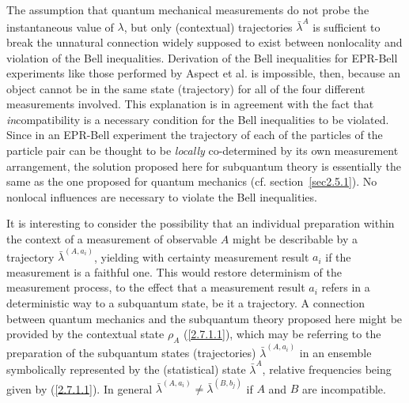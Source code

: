 \documentclass[12pt]{article}
\begin{document}
The assumption that quantum mechanical measurements do not probe
the instantaneous value of $\lambda$, but only (contextual)
trajectories $\bar{\lambda}^A$ is sufficient to break the
unnatural connection widely supposed to exist between nonlocality
and violation of the Bell inequalities. Derivation of the Bell
inequalities for EPR-Bell experiments like those performed by
Aspect et al. \cite{Asp81,Asp82} is impossible, then, because an
object cannot be in the same state (trajectory) for all of the
four different measurements involved. This explanation is in
agreement with the fact that {\em in}compatibility is a necessary
condition for the Bell inequalities to be violated. Since in an
EPR-Bell experiment the trajectory of each of the particles of the
particle pair can be thought to be {\em locally} co-determined by
its own measurement arrangement, the solution proposed here for
subquantum theory is essentially the same as the one proposed for
quantum mechanics (cf. section~\ref{sec2.5.1}). No nonlocal
influences are necessary to violate the Bell inequalities.

It is interesting to consider the possibility that an individual
preparation within the context of a measurement of observable $A$
might be describable by a trajectory $\bar{\lambda}^{(A,a_i)}$,
yielding with certainty measurement result $a_i$ if the
measurement is a faithful one. This would restore determinism of
the measurement process, to the effect that a measurement result
$a_i$ refers in a deterministic way to a subquantum state, be it a
trajectory. A connection between quantum mechanics and the
subquantum theory proposed here might be provided by the
contextual state $\rho_A$ (\ref{2.7.1.1}), which may be referring
to the preparation of the subquantum states (trajectories)
$\bar{\lambda}^{(A,a_i)}$ in an ensemble symbolically represented
by the (statistical) state $\bar{\lambda}^A$, relative frequencies
being given by (\ref{2.7.1.1}). In general
$\bar{\lambda}^{(A,a_i)}\neq \bar{\lambda}^{(B,b_j)}$ if $A$ and
$B$ are incompatible.
\end{document}
